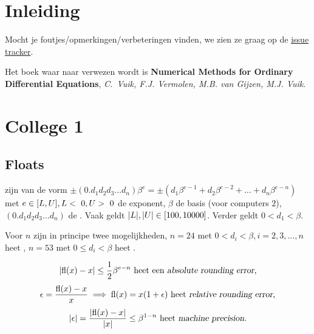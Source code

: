 \documentclass{2wn20summary}
\begin{document}
	\maketitle
	\thispagestyle{empty}
	\newpage
	
	\section{Inleiding}
			
	Mocht je foutjes/opmerkingen/verbeteringen vinden, we zien ze graag op de \href{https://github.com/PHPirates/2WN20-summary/issues}{issue tracker}.
	
	Het boek waar naar verwezen wordt is \textbf{Numerical Methods for Ordinary Differential Equations}, \textit{C.~Vuik, F.J. Vermolen, M.B. van Gijzen, M.J. Vuik}.

	\section{College 1}
	\subsection{Floats}
		 zijn van de vorm $\pm (0.d_1 d_2 d_3 \dots d_n)\beta^e = \pm  (d_1 \beta^{e-1}+d_2 \beta^{e-2}+\dots + d_n \beta^{e-n})$ met $e \in [L,U], \linebreak L<~0, U>~0$ de exponent, $\beta$ de basis (voor computers $2$), $(0.d_1 d_2 d_3 \dots d_n)$ de . Vaak geldt ${\left|L\right|},{\left|U\right|} \in [100,10000]$. Verder geldt $ 0 < d_1 < \beta $.
		
		\begin{define}
		Voor $n$ zijn in principe twee mogelijkheden, $n=24$ met $0<d_i<\beta, i=2,3,\dotsc ,n$ heet , $n=53$ met $0 \le d_i < \beta$ heet . 
		\end{define}
		
		\begin{define}
			\[
				\abs{\fl(x)-x} \le \frac{1}{2} \beta^{e-n} \text{ heet een \indx{absolute rounding error},}
			\]
			\[
				\epsilon = \frac{\fl(x) - x}{x} \implies \fl(x) = x(1 + \epsilon) \text{ heet \indx{relative rounding error},}
			\]
			\[ 
				\abs{\epsilon} = \frac{\abs{\fl (x) - x}}{\abs{x}} \leq \beta^{1-n} \text{ heet \indx{machine precision}.}
			\]
		\end{define}
		
\end{document}
